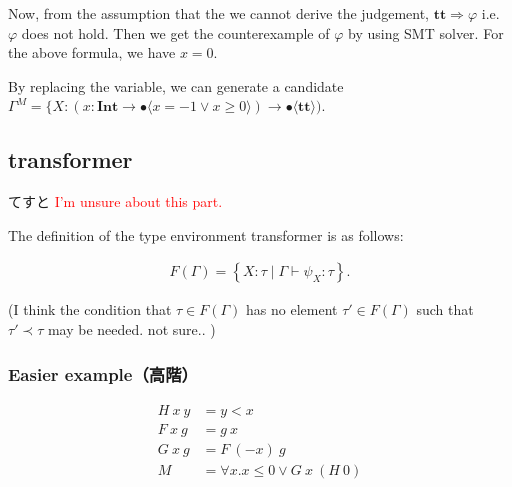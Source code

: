 \documentclass[runningheads]{llncs}
\newcommand\COL{\mathbin{:}}
\newcommand \true {\textbf{tt}}
\newcommand \stypeint {\textbf{Int}}
\newcommand \stypebool {\bullet}
\newcommand \typeint[1]{{#1} : \stypeint}
\newcommand \typebool[1]{\stypebool \langle #1 \rangle}
\begin{document}
Now, from the assumption that the we cannot derive the judgement,
\( \true \Rightarrow \varphi \) i.e. \( \varphi \) does not hold.
Then we get the counterexample of \( \varphi \) by using SMT solver.
For the above formula, we have \( x = 0 \).

By replacing the variable, we can generate a candidate
\( \Gamma^M = \{ X \COL (\typeint{x} \to \typebool{x= -1 \lor x \geq 0}) \rightarrow
\typebool{\true}) \).

\subsection{transformer}
てすと
\textcolor{red}{I'm unsure about this part.}

The definition of the type environment transformer is as follows:

\begin{align*}
    F(\Gamma) = \left \{ X \COL \tau \mid
        \Gamma \vdash \psi_X \COL \tau \right \}.
\end{align*}

(I think the condition that \( \tau \in F(\Gamma) \) has no element \( \tau' \in F(\Gamma) \)
such that \( \tau' \prec \tau \) may be needed. not sure.. )
%
%
%

\subsubsection{Easier example（高階）}

\begin{align*}
    H\ x\ y &= y < x \\
    F\ x\ g &= g\ x\\
    G\ x\ g &= F\ (-x)\ g\\
    M &= \forall x. x \leq 0 \lor G\ x\ (H\ 0)
\end{align*}
\end{document}
